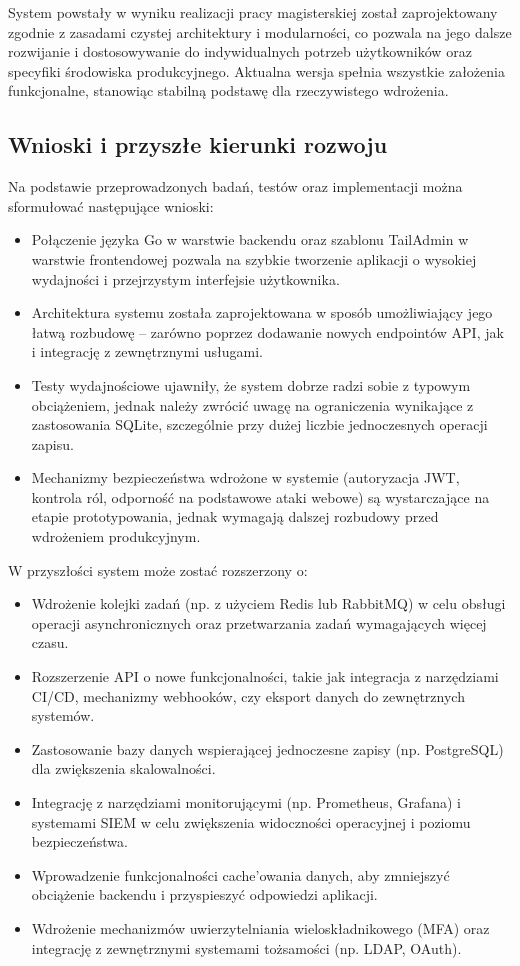System powstały w wyniku realizacji pracy magisterskiej został zaprojektowany zgodnie z zasadami czystej architektury i modularności, co pozwala na jego dalsze rozwijanie i dostosowywanie do indywidualnych potrzeb użytkowników oraz specyfiki środowiska produkcyjnego. Aktualna wersja spełnia wszystkie założenia funkcjonalne, stanowiąc stabilną podstawę dla rzeczywistego wdrożenia.

\subsection{Wnioski i przyszłe kierunki rozwoju}

Na podstawie przeprowadzonych badań, testów oraz implementacji można sformułować następujące wnioski:

\begin{itemize}
    \item Połączenie języka Go w warstwie backendu oraz szablonu TailAdmin w warstwie frontendowej pozwala na szybkie tworzenie aplikacji o wysokiej wydajności i przejrzystym interfejsie użytkownika.
    \item Architektura systemu została zaprojektowana w sposób umożliwiający jego łatwą rozbudowę – zarówno poprzez dodawanie nowych endpointów API, jak i integrację z zewnętrznymi usługami.
    \item Testy wydajnościowe ujawniły, że system dobrze radzi sobie z typowym obciążeniem, jednak należy zwrócić uwagę na ograniczenia wynikające z zastosowania SQLite, szczególnie przy dużej liczbie jednoczesnych operacji zapisu.
    \item Mechanizmy bezpieczeństwa wdrożone w systemie (autoryzacja JWT, kontrola ról, odporność na podstawowe ataki webowe) są wystarczające na etapie prototypowania, jednak wymagają dalszej rozbudowy przed wdrożeniem produkcyjnym.
\end{itemize}

W przyszłości system może zostać rozszerzony o:

\begin{itemize}
    \item Wdrożenie kolejki zadań (np. z użyciem Redis lub RabbitMQ) w celu obsługi operacji asynchronicznych oraz przetwarzania zadań wymagających więcej czasu.
    \item Rozszerzenie API o nowe funkcjonalności, takie jak integracja z narzędziami CI/CD, mechanizmy webhooków, czy eksport danych do zewnętrznych systemów.
    \item Zastosowanie bazy danych wspierającej jednoczesne zapisy (np. PostgreSQL) dla zwiększenia skalowalności.
    \item Integrację z narzędziami monitorującymi (np. Prometheus, Grafana) i systemami SIEM w celu zwiększenia widoczności operacyjnej i poziomu bezpieczeństwa.
    \item Wprowadzenie funkcjonalności cache’owania danych, aby zmniejszyć obciążenie backendu i przyspieszyć odpowiedzi aplikacji.
    \item Wdrożenie mechanizmów uwierzytelniania wieloskładnikowego (MFA) oraz integrację z zewnętrznymi systemami tożsamości (np. LDAP, OAuth).
\end{itemize}

